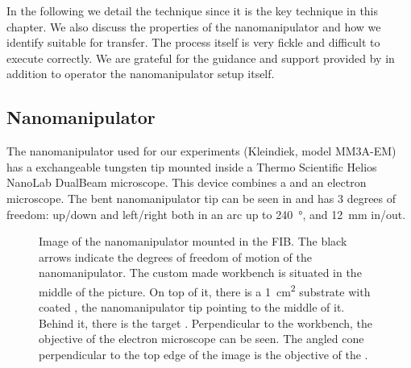 		In the following we detail the \pp technique since it is the key technique in this chapter. We also discuss the properties of the nanomanipulator and how we identify \nds suitable for \pp transfer. The \pp process itself is very fickle and difficult to execute correctly. We are grateful for the guidance and support provided by \pauly in addition to operator the nanomanipulator setup itself.
		
	\subsection{Nanomanipulator} \label{subsec::nanomanipulator}

		The nanomanipulator used for our experiments (Kleindiek, model MM3A-EM) has a exchangeable tungsten tip
	  mounted inside a Thermo Scientific\texttrademark{} Helios NanoLab\texttrademark{} DualBeam\texttrademark{} microscope. This device combines a \fib and an electron microscope.
		The bent nanomanipulator tip can be seen in  and has $3$ degrees of freedom: up/down and left/right both in an arc up to \SI{240}{\degree}, and \SI{12}{\milli\metre} in/out.

		\begin{figure}[!htb]
				\centering
				\caption[Nanomanipulator in a SEM setup]{Image of the nanomanipulator mounted in the FIB. The black arrows indicate the degrees of freedom of motion of the nanomanipulator. The custom made workbench is situated in the middle of the picture. On top of it, there is a \SI{1}{\centi\meter\squared} substrate with coated \nds, the nanomanipulator tip pointing to the middle of it. Behind it, there is the target \vcsel. Perpendicular to the workbench, the objective of the electron microscope can be seen. The angled cone perpendicular to the top edge of the image is the objective of the \fib.}
				\label{fig::nanomanipulator_image}
		\end{figure}

